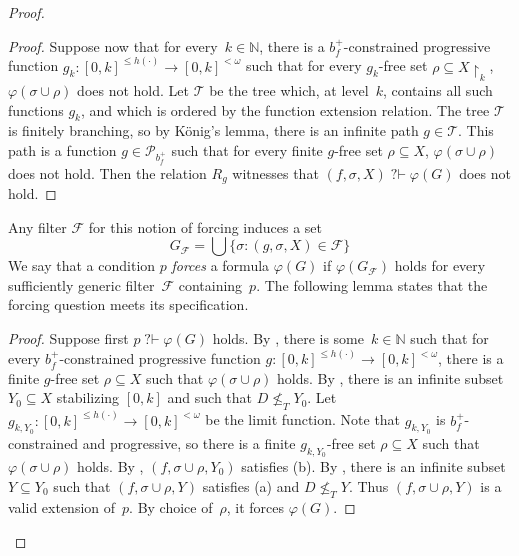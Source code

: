 \documentclass[10pt,a4paper]{article}
\def\F{\mathcal{F}}
\def\P{\mathcal{P}}
\newcommand{\uh}{\upharpoonright}
\newcommand{\qvdash}{\operatorname{{?}{\vdash}}}
\newcommand{\nqvdash}{\operatorname{{?}{\nvdash}}}
\newcommand{\NN}[0]{\mathbb{N}}
\numberwithin{theorem}{section}
\newtheorem{lemma}[theorem]{Lemma}
\newcommand{\T}{\mathcal{T}}
\begin{document}
\begin{proof}
\begin{proof}
Suppose now that for every~$k \in \NN$, there is a $b_f^{+}$-constrained progressive function $g_k : [0, k]^{\leq h(\cdot)} \to [0, k]^{<\omega}$ such that for every $g_k$-free set $\rho \subseteq X \uh_k$, $\varphi(\sigma \cup \rho)$ does not hold. Let $\T$ be the tree which, at level~$k$, contains all such functions $g_k$, and which is ordered by the function extension relation. The tree $\T$ is finitely branching, so by K\"onig's lemma, there is an infinite path $g \in \T$. This path is a function $g \in \P_{b_f^+}$ such that for every finite $g$-free set $\rho \subseteq X$, $\varphi(\sigma \cup \rho)$ does not hold. Then the relation $R_g$ witnesses that $(f, \sigma, X) \qvdash \varphi(G)$ does not hold.
\end{proof}

Any filter $\F$ for this notion of forcing induces a set 
$$
G_\F = \bigcup \{ \sigma : (g, \sigma, X) \in \F \}
$$
We say that a condition $p$ \emph{forces} a formula $\varphi(G)$ if $\varphi(G_\F)$ holds for every sufficiently generic filter~$\F$ containing~$p$.
The following lemma states that the forcing question meets its specification.

\begin{proof}
Suppose first $p \qvdash \varphi(G)$ holds. By , there is some~$k \in \NN$ such that for every $b_f^{+}$-constrained progressive function $g : [0, k]^{\leq h(\cdot)} \to [0, k]^{<\omega}$, there is a finite $g$-free set $\rho \subseteq X$ such that $\varphi(\sigma \cup \rho)$ holds. By , there is an infinite subset $Y_0 \subseteq X$ stabilizing $[0, k]$ and such that $D \not \leq_T Y_0$. Let $g_{k,Y_0} : [0, k]^{\leq h(\cdot)} \to [0, k]^{<\omega}$ be the limit function. Note that $g_{k,Y_0}$ is $b_f^{+}$-constrained and progressive, so there is a finite $g_{k,Y_0}$-free set $\rho \subseteq X$ such that $\varphi(\sigma \cup \rho)$ holds.
By , $(f, \sigma \cup \rho, Y_0)$ satisfies (b).
By , there is an infinite subset $Y \subseteq Y_0$ such that $(f, \sigma \cup \rho, Y)$ satisfies (a) and $D \not \leq_T Y$. Thus $(f, \sigma \cup \rho, Y)$ is a valid extension of~$p$. By choice of~$\rho$, it forces $\varphi(G)$.


\end{proof}
\end{proof}
\end{document}
